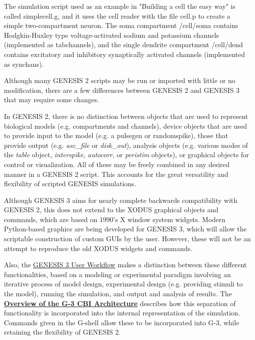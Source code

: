 \documentclass[12pt]{article}
\begin{document}
The simulation script used as an example in "Building a cell the easy
way" is called simplecell.g, and it uses the cell reader with the file
cell.p to create a simple two-compartment neuron.  The soma
compartment /cell/soma contains Hodgkin-Huxley type voltage-activated
sodium and potassium channels (implemented as tabchannels), and the single
dendrite compartment /cell/dend contains excitatory and inhibitory
synaptically activated channels (implemented as synchans).

Although many GENESIS 2 scripts may be run or imported with little or no
modification, there are a few differences between GENESIS 2 and GENESIS 3
that may require some changes.

In GENESIS 2, there is no distinction between objects that are used to
represent biological models (e.g. compartments and channels), device
objects that are used to provide input to the model (e.g. a pulsegen or
randomspike), those that provide output (e.g. {\it asc\_file} or {\it disk\_out}),
analysis objects (e.g. various modes of the {\it table} object, {\it interspike},
{\it autocorr}, or {\it peristim} objects), or graphical objects for control or
visualization.  All of these may be freely combined in any desired
manner in a GENESIS 2 script.  This accounts for the great versatility
and flexibility of scripted GENESIS simulations.

Although GENESIS 3 aims for nearly complete backwards compatibility
with GENESIS 2, this does not extend to the XODUS graphical objects and
commands, which are based on 1990's X window system widgets.  Modern
Python-based graphics are being developed for GENESIS 3, which will
allow the scriptable construction of custom GUIs by the user.
However, these will not be an attempt to reproduce the old XODUS
widgets and commands.

Also, the \href{../workflow-user/workflow-user.html}{GENESIS 3 User Workflow} makes a distinction
between these different functionalities, based on a modeling or experimental paradigm involving an
iterative process of model design, experimental design (e.g. providing stimuli to the model),
running the simulation, and output and analysis of results.  The \href{../genesis-overview/
genesis-overview.tex}{\bf Overview of the G-3 CBI Architecture} describes how this separation of
functionality is incorporated into the internal representation of the simulation.  Commands given in
the G-shell allow these to be incorporated into G-3, while retaining the flexibility of GENESIS 2.
\end{document}
